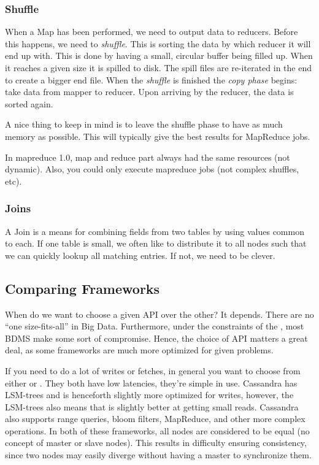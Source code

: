 \subsubsection{Shuffle}
When a Map has been performed, we need to output data to reducers. Before this happens,
we need to \textit{shuffle}. This is sorting the data by which reducer it will end up with. This is done by having a small, circular buffer being filled up. When it reaches
a given size it is spilled to disk. The spill files are re-iterated in the end to create
a bigger end file. When the \textit{shuffle} is finished the \textit{copy phase} begins: take data from mapper to reducer. Upon arriving by the reducer, the data is sorted again.

A nice thing to keep in mind is to leave the shuffle phase to have as much memory as possible. This will typically give the best results for MapReduce jobs.

In mapreduce 1.0, map and reduce part always had the same resources (not dynamic). Also, you could only execute mapreduce jobs (not complex shuffles, etc).

\subsubsection{Joins}
A Join is a means for combining fields from two tables by using values common to each.
If one table is small, we often like to distribute it to all nodes such that we 
can quickly lookup all matching entries. If not, we need to be clever.


\subsection{Comparing Frameworks}
When do we want to choose a given API over the other? It depends.
There are no ``one size-fits-all'' in Big Data. Furthermore, under the constraints of
the , most BDMS make some sort of compromise. Hence,
the choice of API matters a great deal, as some frameworks are much more optimized
for given problems.

If you need to do a lot of writes or fetches, in general you want to choose from either
 or . They both have low latencies, they're simple in use. Cassandra has LSM-trees and is henceforth slightly more optimized for writes, however, the LSM-trees also means that 
is slightly better at getting small reads. Cassandra also supports range queries, bloom filters, MapReduce, and other more complex operations. In both of these frameworks, all
nodes are considered to be equal (no concept of master or slave nodes). This
results in difficulty ensuring consistency, since two nodes may easily diverge
without having a master to synchronize them.

